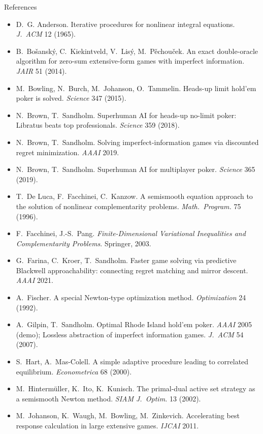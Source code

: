 \documentclass[10pt,aspectratio=169]{beamer}
\begin{document}
\begin{frame}[allowframebreaks]{References}
\scriptsize
\begin{itemize}\setlength\itemsep{1pt}
\item D.~G. Anderson. Iterative procedures for nonlinear integral equations. \emph{J.\ ACM} 12 (1965).
\item B.~Bo\v{s}ansk\'y, C.~Kiekintveld, V.~Lis\'y, M.~P\v{e}chou\v{c}ek. An exact double-oracle algorithm for zero-sum extensive-form games with imperfect information. \emph{JAIR} 51 (2014).
\item M.~Bowling, N.~Burch, M.~Johanson, O.~Tammelin. Heads-up limit hold'em poker is solved. \emph{Science} 347 (2015).
\item N.~Brown, T.~Sandholm. Superhuman AI for heads-up no-limit poker: Libratus beats top professionals. \emph{Science} 359 (2018).
\item N.~Brown, T.~Sandholm. Solving imperfect-information games via discounted regret minimization. \emph{AAAI} 2019.
\item N.~Brown, T.~Sandholm. Superhuman AI for multiplayer poker. \emph{Science} 365 (2019).
\item T.~De Luca, F.~Facchinei, C.~Kanzow. A semismooth equation approach to the solution of nonlinear complementarity problems. \emph{Math.\ Program.} 75 (1996).
\item F.~Facchinei, J.-S.~Pang. \emph{Finite-Dimensional Variational Inequalities and Complementarity Problems}. Springer, 2003.
\item G.~Farina, C.~Kroer, T.~Sandholm. Faster game solving via predictive Blackwell approachability: connecting regret matching and mirror descent. \emph{AAAI} 2021.
\item A.~Fischer. A special Newton-type optimization method. \emph{Optimization} 24 (1992).
\item A.~Gilpin, T.~Sandholm. Optimal Rhode Island hold'em poker. \emph{AAAI} 2005 (demo); Lossless abstraction of imperfect information games. \emph{J.\ ACM} 54 (2007).
\item S.~Hart, A.~Mas-Colell. A simple adaptive procedure leading to correlated equilibrium. \emph{Econometrica} 68 (2000).
\item M.~Hinterm\"uller, K.~Ito, K.~Kunisch. The primal-dual active set strategy as a semismooth Newton method. \emph{SIAM J.\ Optim.} 13 (2002).
\item M.~Johanson, K.~Waugh, M.~Bowling, M.~Zinkevich. Accelerating best response calculation in large extensive games. \emph{IJCAI} 2011.

\end{itemize}
\end{frame}
\end{document}
